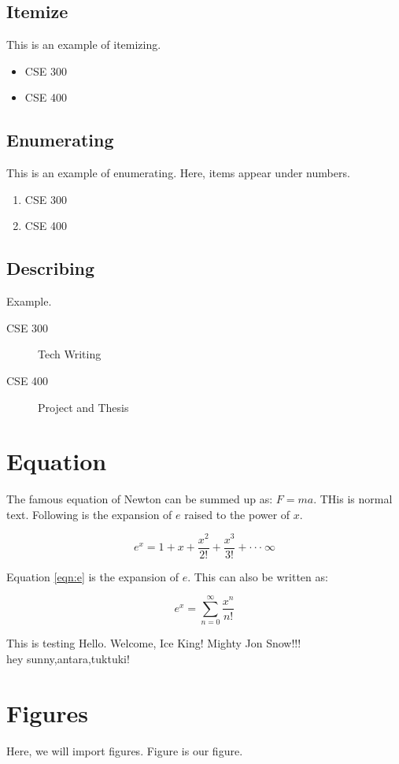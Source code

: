 \documentclass{book}
\newcommand{\testcommand}{Hello}
\newcommand{\anothertestcommand}[2]{Welcome, #2! Mighty #1!!!}
\newcommand{\testingcommand}[3]{hey #1,#2,#3!}
\begin{document}
\subsection{Itemize}

This is an example of itemizing.

\begin{itemize}
    \item CSE 300
    \item CSE 400
\end{itemize}

\subsection{Enumerating}

This is an example of enumerating. Here, items appear under numbers.

\begin{enumerate}
    \item CSE 300
    \item CSE 400
\end{enumerate}

\subsection{Describing}

Example.

\begin{description}
    \item[CSE 300] Tech Writing
    \item[CSE 400] Project and Thesis
\end{description}


\section{Equation}

The famous equation of Newton can be summed up as: $F = ma$. THis is normal text. Following is the expansion of $e$ raised to the power of $x$.

\begin{equation}
    e ^ x = 1 + x + \frac{x ^ 2}{ 2 !} + \frac{x ^ 3}{3!} + \cdot \cdot \cdot ~ \infty
    \label{eqn:e}
\end{equation}

Equation \ref{eqn:e} is the expansion of $e$. This can also be written as:

\begin{equation}
    e ^ x = \sum_{n=0}^{\infty} \frac{x ^ n}{n !}
\end{equation}

This is testing \testcommand. \anothertestcommand{Jon Snow}{Ice King}\\
\testingcommand{sunny}{antara}{tuktuki}

\section{Figures}

Here, we will import figures. Figure  is our figure.


\lipsum
\end{document}
